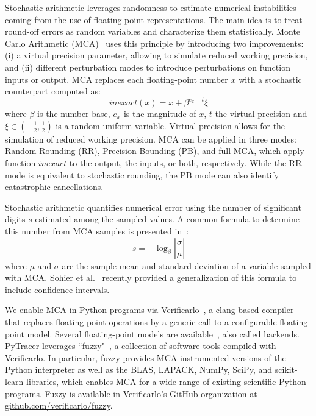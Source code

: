 \documentclass[11pt]{article}
\newcommand{\pytracer}[0]{PyTracer\xspace}
\begin{document}
Stochastic arithmetic leverages randomness to estimate numerical instabilities coming from the use of floating-point representations. The main idea is to treat round-off errors as random variables and characterize them statistically.
Monte Carlo Arithmetic (MCA)~\cite{parker1997monte} uses this principle by introducing two improvements:
(i) a virtual precision parameter, allowing to simulate reduced working precision, and (ii) different perturbation modes to introduce perturbations
on function inputs or output.
MCA replaces each floating-point number $x$ with a stochastic counterpart computed as:
\[
inexact(x) =  x + \beta^{e_x - t}\xi
\]
where $\beta$ is the number base, $e_x$ is the magnitude of $x$, $t$ the virtual precision and $\xi \in (-\frac{1}{2},\frac{1}{2})$ is a random uniform variable.
Virtual precision allows for the simulation of reduced working precision.
MCA can be applied in three modes: Random Rounding (RR), Precision Bounding (PB), and full MCA, which apply function $inexact$ to the output, the inputs, or both, respectively. While the RR mode is equivalent to stochastic rounding, the PB mode can also identify catastrophic cancellations.

Stochastic arithmetic quantifies numerical error using the number of significant digits $s$ estimated among the sampled values. A common formula to determine this number from MCA samples is presented in~\cite{parker1997monte}:
\begin{equation}
s = -\log_{\beta}{ \left| \dfrac{\sigma}{\mu} \right|} \label{eq:sig-digits}
\end{equation}
where $\mu$ and $\sigma$ are the sample mean and standard deviation of a variable sampled with MCA.  
Sohier et al.~\cite{sohier2018confidence} recently provided a generalization of this formula to include confidence intervals.

We enable MCA in Python programs via Verificarlo~\cite{verificarlo}, a clang-based compiler~\cite{lattner2008llvm} that replaces floating-point operations by a generic call to a configurable floating-point model. Several floating-point models are available~\cite{chatelain2019automatic,chatelain2019outils}, also called backends.
\pytracer leverages ``fuzzy"~\cite{kiar2020comparing}, a collection of software tools compiled with Verificarlo. In particular, fuzzy provides MCA-instrumented versions of the Python interpreter as well as the BLAS, LAPACK, NumPy, SciPy, and scikit-learn libraries, which enables MCA for a wide range of existing scientific Python programs. Fuzzy is available in Verificarlo's GitHub organization at \href{https://github.com/verificarlo/fuzzy}{\url{github.com/verificarlo/fuzzy}}.
\end{document}
